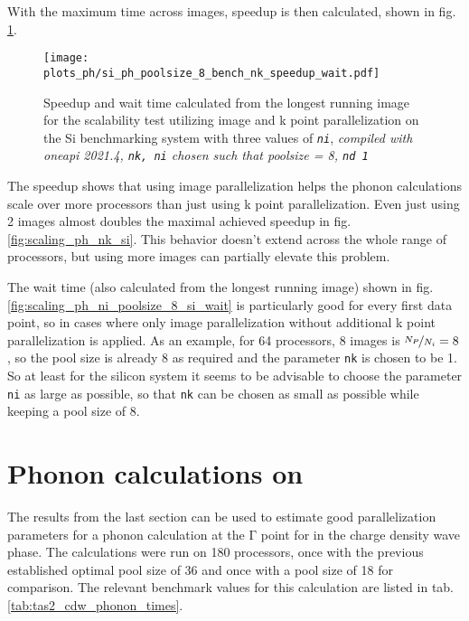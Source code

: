 \documentclass[main.tex]{subfiles}
\begin{document}
With the maximum time across images, speedup is then calculated, shown in fig. \ref{fig:scaling_ph_ni_poolsize_8_si}.

\begin{figure}[htb!]
    \centering
    \texttt{[image: plots\_ph/si\_ph\_poolsize\_8\_bench\_nk\_speedup\_wait.pdf]}
    \caption{Speedup and wait time calculated from the longest running image for the scalability test utilizing image and k point parallelization on the Si benchmarking system with three values of \emph{\texttt{ni}}, \emph{\QE compiled with \gls{oneapi} 2021.4, \texttt{nk, ni} chosen such that poolsize = 8, \texttt{nd 1}}}
    \label{fig:scaling_ph_ni_poolsize_8_si}
\end{figure}
The speedup shows that using image parallelization helps the phonon calculations scale over more processors than just using k point parallelization.
Even just using 2 images almost doubles the maximal achieved speedup in fig. \ref{fig:scaling_ph_nk_si}.
This behavior doesn't extend across the whole range of processors, but using more images can partially elevate this problem.

The wait time (also calculated from the longest running image) shown in fig. \ref{fig:scaling_ph_ni_poolsize_8_si_wait} is particularly good for every first data point, so in cases where only image parallelization without additional k point parallelization is applied.
As an example, for 64 processors, 8 images is \(\nicefrac{N_P}{N_i} = 8\), so the pool size is already 8 as required and the parameter \texttt{nk} is chosen to be 1.
So at least for the silicon system it seems to be advisable to choose the parameter \texttt{ni} as large as possible, so that \texttt{nk} can be chosen as small as possible while keeping a pool size of 8.

\section{Phonon calculations on \TaS}\label{sec:phonon_tas2}

The results from the last section can be used to estimate good parallelization parameters for a phonon calculation at the \(\mathrm{\Gamma}\) point for \TaS in the charge density wave phase.
The calculations were run on 180 processors, once with the previous established optimal pool size of 36 and once with a pool size of 18 for comparison.
The relevant benchmark values for this calculation are listed in tab. \ref{tab:tas2_cdw_phonon_times}.
\end{document}
